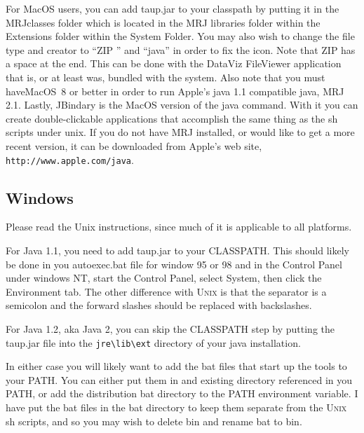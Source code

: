 For MacOS users, you can add taup.jar to your classpath by putting it in the
MRJclasses folder which is located in the MRJ libraries folder within the Extensions folder within the System Folder. You may also wish to change the file type and creator to ``ZIP '' and
``java'' in order to fix the icon. Note that ZIP has a space at the end. This can be done with the DataViz FileViewer application that is, or at least was, bundled with the system. Also note that you must haveMacOS~8 or better in order to run Apple's java 1.1 compatible java, MRJ 2.1. Lastly, JBindary is the MacOS version of the java command. With it you can create double-clickable applications that accomplish the same thing as the sh scripts under unix. If you do not have MRJ installed, or would like to get a more recent version, it can be downloaded from Apple's web site, \verb+http://www.apple.com/java+.

\subsection{Windows}

Please read the Unix instructions, since much of it is applicable to all platforms.

For Java 1.1, you need to add taup.jar to your CLASSPATH. This should likely 
be done in you autoexec.bat file for window 95 or 98 and in the Control Panel 
under windows NT, start the Control Panel, select System, then click the 
Environment tab. The other difference with \textsc{Unix} is that the separator is a semicolon and the forward slashes should be replaced with backslashes.

For Java 1.2, aka Java 2, you can skip the CLASSPATH step by putting the taup.jar file into the \verb+jre\lib\ext+ directory of your java installation.
 
In either case you will likely want to add the bat files that start up the 
tools to your PATH. You can either put them in and existing directory 
referenced in you PATH, or add the distribution bat directory to the 
PATH environment variable. I have put the bat files in the bat directory to 
 keep them separate from the \textsc{Unix} sh scripts, and so you may wish 
to delete bin and rename bat to bin.